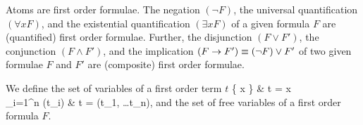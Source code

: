 
\begin{definition}[\FOF]\label{def:syntax:FOF}
	Atoms are {\myem first order formulae}. 
	The negation $(\lnot F)$, 
	the universal quantification $(\forall x F)$, 
	and the existential quantification $(\exists x F)$ 
	of a given formula $F$ are (quantified) first order formulae.
	Further, the disjunction $(F \lor F')$, 
	the conjunction $(F \land F') $, 
	and the implication $(F \rightarrow F') \equiv (\lnot F) \lor F'$ 
	of two given formulae $F$ and $F'$ 
	are (composite) first order formulae.
\end{definition}

\begin{definition}We define the set of variables of a first order term $t$
	 {
		\{ x \} &  t = x \in \mcV \\
		\bigcup_{i=1}^n \var(t_i) &   t = \mf(t_1, \ldots t_n), \mf \in \mcFfn
	}
and the set of {\myem free} variables of a first order formula $F$.
\end{definition}